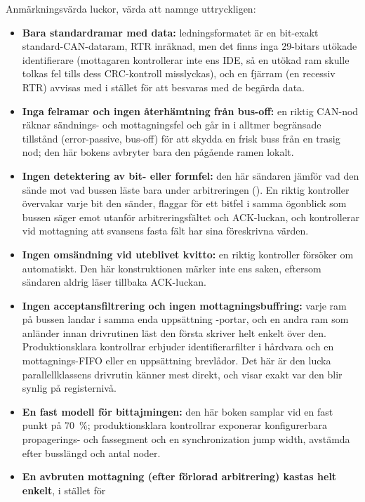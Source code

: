 Anmärkningsvärda luckor, värda att namnge uttryckligen:
\begin{itemize}
  \item \textbf{Bara standardramar med data:} ledningsformatet är en bit-exakt standard-CAN-dataram,
    RTR inräknad, men det finns inga 29-bitars utökade identifierare (mottagaren kontrollerar inte
    ens IDE, så en utökad ram skulle tolkas fel tills dess CRC-kontroll misslyckas), och en fjärram
    (en recessiv RTR) avvisas med  i stället för att besvaras med de begärda data.
  \item \textbf{Inga felramar och ingen återhämtning från bus-off:} en riktig CAN-nod räknar
    sändnings- och mottagningsfel och går in i alltmer begränsade tillstånd (error-passive, bus-off)
    för att skydda en frisk buss från en trasig nod; den här bokens  avbryter
    bara den pågående ramen lokalt.
  \item \textbf{Ingen detektering av bit- eller formfel:} den här sändaren jämför vad den sände mot
    vad bussen läste bara under arbitreringen (). En riktig kontroller övervakar
    varje bit den sänder, flaggar för ett bitfel i samma ögonblick som bussen säger emot utanför
    arbitreringsfältet och ACK-luckan, och kontrollerar vid mottagning att svansens fasta fält har
    sina föreskrivna värden.
  \item \textbf{Ingen omsändning vid uteblivet kvitto:} en riktig kontroller försöker om automatiskt.
    Den här konstruktionen märker inte ens saken, eftersom sändaren aldrig läser tillbaka ACK-luckan.
  \item \textbf{Ingen acceptansfiltrering och ingen mottagningsbuffring:} varje ram på bussen landar
    i samma enda uppsättning -portar, och en andra ram som anländer innan drivrutinen läst
    den första skriver helt enkelt över den. Produktionsklara kontrollrar erbjuder identifierarfilter
    i hårdvara och en mottagnings-FIFO eller en uppsättning brevlådor. Det här är den lucka
    parallellklassens drivrutin känner mest direkt, och  visar exakt var den blir
    synlig på registernivå.
  \item \textbf{En fast modell för bittajmingen:} den här boken samplar vid en fast punkt på 70~\%;
    produktionsklara kontrollrar exponerar konfigurerbara propagerings- och fassegment och en
    synchronization jump width, avstämda efter busslängd och antal noder.
  \item \textbf{En avbruten mottagning (efter förlorad arbitrering) kastas helt enkelt}, i stället för

\end{itemize}

